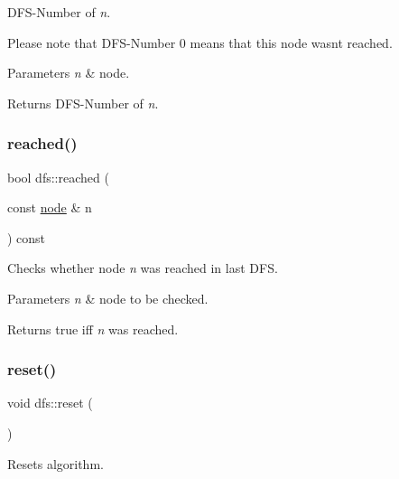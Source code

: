 D\+F\+S-\/\+Number of {\itshape n}. 

Please note that D\+F\+S-\/\+Number 0 means that this node wasn\textquotesingle{}t reached.


\begin{DoxyParams}{Parameters}
{\em n} & node. \\
\hline
\end{DoxyParams}
\begin{DoxyReturn}{Returns}
D\+F\+S-\/\+Number of {\itshape n}. 
\end{DoxyReturn}
\mbox{\label{classdfs_a2948061eb1ea02f57614f9044c8e63cf}} 
\subsubsection{\texorpdfstring{reached()}{reached()}}
{\footnotesize\ttfamily bool dfs\+::reached (\begin{DoxyParamCaption}\item[{const \mbox{\hyperlink{classnode}{node}} \&}]{n }\end{DoxyParamCaption}) const\hspace{0.3cm}{\ttfamily [inline]}}



Checks whether node {\itshape n} was reached in last D\+FS. 


\begin{DoxyParams}{Parameters}
{\em n} & node to be checked. \\
\hline
\end{DoxyParams}
\begin{DoxyReturn}{Returns}
true iff {\itshape n} was reached. 
\end{DoxyReturn}
\mbox{\label{classdfs_affaffda8be8418d6dbf396c5b1d6b81a}} 
\subsubsection{\texorpdfstring{reset()}{reset()}}
{\footnotesize\ttfamily void dfs\+::reset (\begin{DoxyParamCaption}{ }\end{DoxyParamCaption})\hspace{0.3cm}{\ttfamily [virtual]}}



Resets algorithm. 

